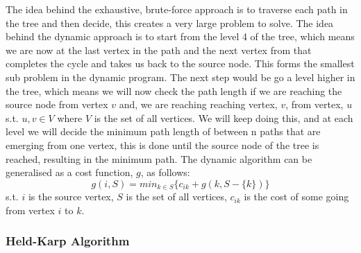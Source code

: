 \documentclass[11pt]{article}
\begin{document}
\begin{center}
\end{center}
The idea behind the exhaustive, brute-force approach is to traverse each path in the tree and then decide, this creates a very large problem to solve. The idea behind the dynamic approach is to start from the level 4 of the tree, which means we are now at the last vertex in the path and the next vertex from that completes the cycle and takes us back to the source node. This forms the smallest sub problem in the dynamic program. The next step would be go a level higher in the tree, which means we will now check the path length if we are reaching the source node from vertex $v$ and, we are reaching reaching vertex, $v$, from vertex, $u$ s.t. $u,v \in V$ where $V$ is the set of all vertices. We will keep doing this, and at each level we will decide the minimum path length of between n paths that are emerging from one vertex, this is done until the source node of the tree is reached, resulting in the minimum path. The dynamic algorithm can be generalised as a cost function, $g$, as follows:
$$g(i, S) = min_{k\in S} \bigg\{c_{ik} + g(k, S-\{k\})\bigg\}$$
s.t. $i$ is the source vertex, $S$ is the set of all vertices, $c_{ik}$ is the cost of some going from vertex $i$ to $k$. 
	
\subsubsection{Held-Karp Algorithm}
		
\end{document}
